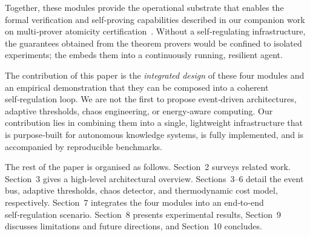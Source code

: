 Together, these modules provide the operational substrate that enables
the formal verification and self‑proving capabilities described in our
companion work on multi‑prover atomicity certification~\cite{beniers2026multi}.
Without a self‑regulating infrastructure, the guarantees obtained from
the theorem provers would be confined to isolated experiments; the \Core{}
embeds them into a continuously running, resilient agent.

The contribution of this paper is the \emph{integrated design} of these
four modules and an empirical demonstration that they can be composed into
a coherent self‑regulation loop.  We are not the first to propose
event‑driven architectures, adaptive thresholds, chaos engineering, or
energy‑aware computing.  Our contribution lies in combining them into a
single, lightweight infrastructure that is purpose‑built for autonomous
knowledge systems, is fully implemented, and is accompanied by reproducible
benchmarks.

The rest of the paper is organised as follows.  Section~2 surveys related
work.  Section~3 gives a high‑level architectural overview.  Sections~3--6
detail the event bus, adaptive thresholds, chaos detector, and
thermodynamic cost model, respectively.  Section~7 integrates the four
modules into an end‑to‑end self‑regulation scenario.  Section~8 presents
experimental results, Section~9 discusses limitations and future directions,
and Section~10 concludes.
